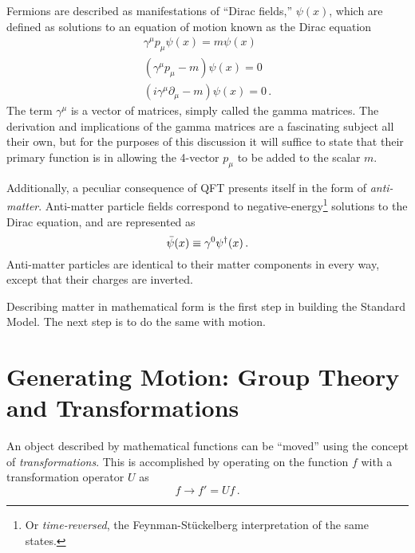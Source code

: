     Fermions are described as manifestations of ``Dirac fields,'' $\psi(x)$,
        which are defined as solutions to an equation of motion known as the Dirac equation
    \begin{equation} \begin{split}
        \gamma^\mu p_\mu \psi(x) = m \psi(x) \\
        (\gamma^\mu p_\mu - m) \psi(x) = 0 \\
        (i\gamma^\mu \partial_\mu - m) \psi(x) = 0
        \,.
    \end{split} \end{equation}
    The term $\gamma^\mu$ is a vector of matrices, simply called the gamma matrices.
    The derivation and implications of the gamma matrices are a fascinating subject all their own, 
        but for the purposes of this discussion it will suffice to state that
        their primary function is in allowing the 4-vector $p_\mu$ to be added to the scalar $m$.

    Additionally, a peculiar consequence of QFT presents itself in the form of \textit{anti-matter}.
    Anti-matter particle fields correspond to negative-energy\footnote{
            Or \textit{time-reversed}, the Feynman-St\"uckelberg interpretation of the same states.
        } solutions to the Dirac equation,
        and are represented as
    \begin{equation}
        \bar{\psi}(x) \equiv \gamma^0 \psi^\dag(x)
        \,.
    \end{equation}
    Anti-matter particles are identical to their matter components in every way,
        except that their charges are inverted.

    Describing matter in mathematical form is the first step in building the Standard Model.
    The next step is to do the same with motion.


\section{Generating Motion: Group Theory and Transformations} \label{sec:group_theory}

    An object described by mathematical functions can be ``moved'' using the concept of \textit{transformations}.
    This is accomplished by operating on the function $f$ with a transformation operator $U$ as
    \begin{equation}
        f \to f' = U f
        \,.
    \end{equation}

